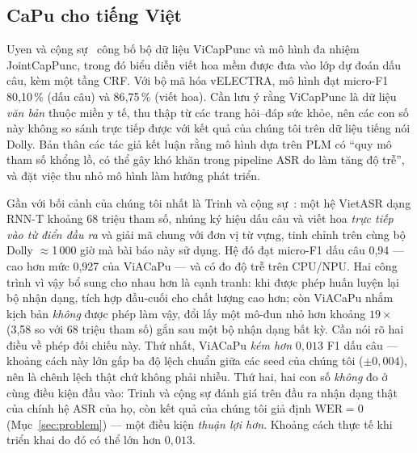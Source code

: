 \documentclass[conference,onecolumn]{IEEEtran}
\begin{document}
\subsection{CaPu cho tiếng Việt}
Uyen và cộng sự~\cite{jointcappunc} công bố bộ dữ liệu ViCapPunc và mô hình đa
nhiệm JointCapPunc, trong đó biểu diễn viết hoa mềm được đưa vào lớp dự đoán dấu
câu, kèm một tầng CRF. Với bộ mã hóa vELECTRA, mô hình đạt micro-F1 80{,}10\,\%
(dấu câu) và 86{,}75\,\% (viết hoa). Cần lưu ý rằng ViCapPunc là dữ liệu
\emph{văn bản} thuộc miền y tế, thu thập từ các trang hỏi--đáp sức khỏe, nên các
con số này không so sánh trực tiếp được với kết quả của chúng tôi trên dữ liệu
tiếng nói Dolly. Bản thân các tác giả kết luận rằng mô hình dựa trên PLM có
``quy mô tham số khổng lồ, có thể gây khó khăn trong pipeline ASR do làm tăng độ
trễ'', và đặt việc thu nhỏ mô hình làm hướng phát triển.

Gần với bối cảnh của chúng tôi nhất là Trinh và cộng sự~\cite{trinh2026}: một hệ
VietASR dạng RNN-T khoảng 68 triệu tham số, nhúng ký hiệu dấu câu và viết hoa
\emph{trực tiếp vào từ điển đầu ra} và giải mã chung với đơn vị từ vựng, tinh chỉnh
trên cùng bộ Dolly $\approx$1\,000 giờ mà bài báo này sử dụng. Hệ đó đạt micro-F1
dấu câu 0{,}94 --- cao hơn mức 0{,}927 của ViACaPu --- và có đo độ trễ trên CPU/NPU.
Hai công trình vì vậy bổ sung cho nhau hơn là cạnh tranh: khi được phép huấn
luyện lại bộ nhận dạng, tích hợp đầu-cuối cho chất lượng cao hơn; còn ViACaPu
nhắm kịch bản \emph{không} được phép làm vậy, đổi lấy một mô-đun nhỏ hơn khoảng
$19\times$ (3{,}58 so với 68 triệu tham số) gắn sau một bộ nhận dạng bất kỳ.
Cần nói rõ hai điều về phép đối chiếu này. Thứ nhất, ViACaPu \emph{kém hơn}
$0{,}013$ F1 dấu câu --- khoảng cách này lớn gấp ba độ lệch chuẩn giữa các seed
của chúng tôi ($\pm0{,}004$), nên là chênh lệch thật chứ không phải nhiễu. Thứ
hai, hai con số \emph{không} đo ở cùng điều kiện đầu vào: Trinh và cộng sự đánh
giá trên đầu ra nhận dạng thật của chính hệ ASR của họ, còn kết quả của chúng
tôi giả định $\mathrm{WER}=0$ (Mục~\ref{sec:problem}) --- một điều kiện
\emph{thuận lợi hơn}. Khoảng cách thực tế khi triển khai do đó có thể lớn hơn
$0{,}013$.
\end{document}
